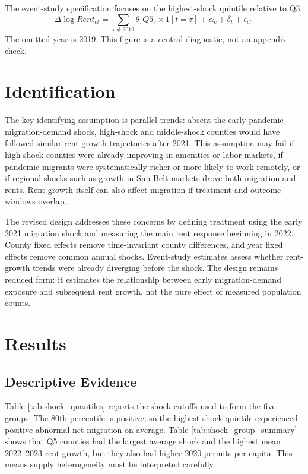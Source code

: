 \documentclass[11pt]{article}
\begin{document}
The event-study specification focuses on the highest-shock quintile relative to Q3:
\[
\Delta \log Rent_{ct}
= \sum_{\tau\neq 2019}\theta_\tau Q5_c\times 1[t=\tau]
+\alpha_c+\delta_t+\epsilon_{ct}.
\]
The omitted year is 2019. This figure is a central diagnostic, not an appendix check.

\section{Identification}

The key identifying assumption is parallel trends: absent the early-pandemic migration-demand shock, high-shock and middle-shock counties would have followed similar rent-growth trajectories after 2021. This assumption may fail if high-shock counties were already improving in amenities or labor markets, if pandemic migrants were systematically richer or more likely to work remotely, or if regional shocks such as growth in Sun Belt markets drove both migration and rents. Rent growth itself can also affect migration if treatment and outcome windows overlap.

The revised design addresses these concerns by defining treatment using the early 2021 migration shock and measuring the main rent response beginning in 2022. County fixed effects remove time-invariant county differences, and year fixed effects remove common annual shocks. Event-study estimates assess whether rent-growth trends were already diverging before the shock. The design remains reduced form: it estimates the relationship between early migration-demand exposure and subsequent rent growth, not the pure effect of measured population counts.

\section{Results}

\subsection{Descriptive Evidence}

Table \ref{tab:shock_quantiles} reports the shock cutoffs used to form the five groups. The 80th percentile is positive, so the highest-shock quintile experienced positive abnormal net migration on average. Table \ref{tab:shock_group_summary} shows that Q5 counties had the largest average shock and the highest mean 2022--2023 rent growth, but they also had higher 2020 permits per capita. This means supply heterogeneity must be interpreted carefully.
\end{document}
